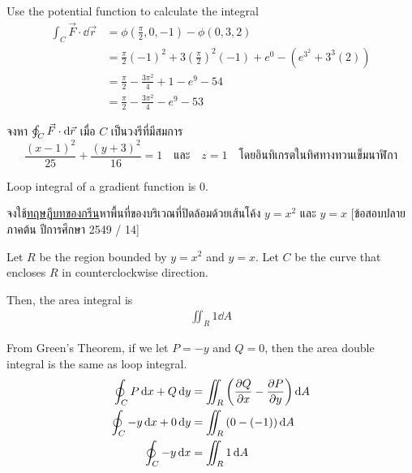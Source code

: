\documentclass[12pt,final]{novelette} %
\begin{document}
\begin{question}
\begin{question}
        Use the potential function to calculate the integral
        \begin{align*}
            \int_C \vec{F} \cdot \dd{\vec{r}} & = \phi\left(\frac{\pi}{2}, 0, -1\right) - \phi\left(0, 3, 2\right)                      \\
                                              & = \frac\pi2(-1)^2 + 3\left(\frac\pi2\right)^2(-1) + e^0 - \left(e^{3^2} + 3^3(2)\right) \\
                                              & = \frac\pi2 - \frac{3\pi^2}{4} + 1 - e^9 - 54                                           \\
                                              & = \boxed{\frac\pi2 - \frac{3\pi^2}{4} - e^9 - 53}
        \end{align*}

        \item
        จงหา $\varointctrclockwise_C \vec{F} \cdot \dd{\vec{r}}$  เมื่อ $C$ เป็นวงรีที่มีสมการ
        $$
            \frac{(x-1)^2}{25} + \frac{(y+3)^2}{16} = 1 \quad \text{และ} \quad z = 1 \quad \text{โดยอินทิเกรตในทิศทางทวนเข็มนาฬิกา}
        $$

        \bigskip
        Loop integral of a gradient function is $\boxed{0}$.
    \end{question}
\end{question}

\pagebreak

\noindent
จงใช้\uline{ทฤษฎีบทของกรีน}หาพื้นที่ของบริเวณที่ปิดล้อมด้วยเส้นโค้ง $y = x^2$ และ $y = x$
[ข้อสอบปลายภาคต้น ปีการศึกษา 2549 / 14]

\bigskip
Let $R$ be the region bounded by $y = x^2$ and $y = x$.
Let $C$ be the curve that encloses $R$ in counterclockwise direction.

\medskip
Then, the area integral is
\begin{align*}
    \iint_R 1 \dd{A}
\end{align*}

From Green's Theorem, if we let $P = -y$ and $Q = 0$, then the area double integral is the same as loop integral.
\begin{align*}
    \oint_C P \dd{x} + Q \dd{y}  & = \iint_R \left(\pdv{Q}{x} - \pdv{P}{y}\right) \dd{A} \\
    \oint_C -y \dd{x} + 0 \dd{y} & = \iint_R \left(0 - (-1)\right) \dd{A}                \\
    \oint_C -y \dd{x}            & = \iint_R 1 \dd{A}
\end{align*}
\end{document}
